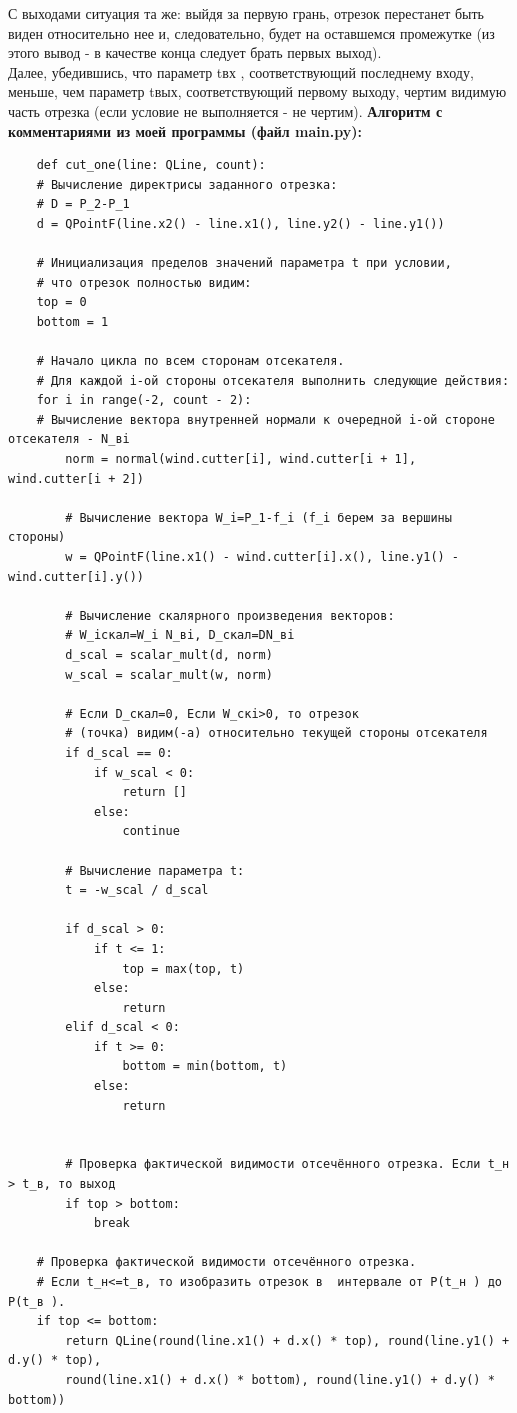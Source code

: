 \documentclass[a4paper,12pt]{article}
\begin{document}
	С выходами ситуация та же: выйдя за первую грань, отрезок перестанет быть виден относительно нее и, следовательно, будет на оставшемся промежутке (из этого вывод - в качестве конца следует брать первых выход).\\
	
	Далее, убедившись, что параметр tвх , соответствующий последнему входу, меньше, чем параметр tвых, соответствующий первому выходу, чертим видимую часть отрезка (если условие не выполняется - не чертим).
	\newpage
	\noindent\textbf{Алгоритм с комментариями из моей программы (файл main.py):}
	
	
	\begin{verbatim}
	def cut_one(line: QLine, count):
	# Вычисление директрисы заданного отрезка:
	# D = P_2-P_1
	d = QPointF(line.x2() - line.x1(), line.y2() - line.y1())
	
	# Инициализация пределов значений параметра t при условии,
	# что отрезок полностью видим:
	top = 0
	bottom = 1
	
	# Начало цикла по всем сторонам отсекателя.
	# Для каждой i-ой стороны отсекателя выполнить следующие действия:
	for i in range(-2, count - 2):
	# Вычисление вектора внутренней нормали к очередной i-ой стороне отсекателя - N_вi
		norm = normal(wind.cutter[i], wind.cutter[i + 1], wind.cutter[i + 2])
	
		# Вычисление вектора W_i=P_1-f_i (f_i берем за вершины стороны)
		w = QPointF(line.x1() - wind.cutter[i].x(), line.y1() - wind.cutter[i].y())
	
		# Вычисление скалярного произведения векторов:
		# W_iскал=W_i N_вi, D_скал=DN_вi
		d_scal = scalar_mult(d, norm)
		w_scal = scalar_mult(w, norm)
		
		# Если D_скал=0, Если W_скi>0, то отрезок
		# (точка) видим(-а) относительно текущей стороны отсекателя
		if d_scal == 0:
			if w_scal < 0:
				return []
			else:
				continue
	
		# Вычисление параметра t:
		t = -w_scal / d_scal
	
		if d_scal > 0:
			if t <= 1:
				top = max(top, t)
			else:
				return
		elif d_scal < 0:
			if t >= 0:
				bottom = min(bottom, t)
			else:
				return
	
	
		# Проверка фактической видимости отсечённого отрезка. Если t_н > t_в, то выход
		if top > bottom:
			break
	
	# Проверка фактической видимости отсечённого отрезка.
	# Если t_н<=t_в, то изобразить отрезок в  интервале от P(t_н ) до P(t_в ).
	if top <= bottom:
		return QLine(round(line.x1() + d.x() * top), round(line.y1() + d.y() * top),
		round(line.x1() + d.x() * bottom), round(line.y1() + d.y() * bottom))
	\end{verbatim}
	
\end{document}
